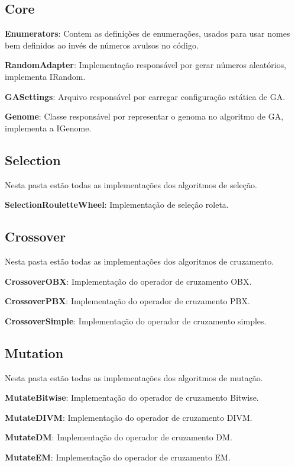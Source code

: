 \subsection{Core}

\textbf{Enumerators}: Contem as definições de enumerações, usados para usar nomes bem definidos ao invés de números avulsos no código.

\textbf{RandomAdapter}: Implementação responsável por gerar números aleatórios, implementa IRandom.

\textbf{GASettings}: Arquivo responsável por carregar configuração estática de GA.

\textbf{Genome}: Classe responsável por representar o genoma no algoritmo de GA, implementa a IGenome.

\subsection{Selection}

Nesta pasta estão todas as implementações dos algoritmos de seleção.

\textbf{SelectionRouletteWheel}: Implementação de seleção roleta.

\subsection{Crossover}

Nesta pasta estão todas as implementações dos algoritmos de cruzamento.

\textbf{CrossoverOBX}: Implementação do operador de cruzamento OBX.

\textbf{CrossoverPBX}: Implementação do operador de cruzamento PBX.

\textbf{CrossoverSimple}:  Implementação do operador de cruzamento simples.

\subsection{Mutation}

Nesta pasta estão todas as implementações dos algoritmos de mutação.

\textbf{MutateBitwise}: Implementação do operador de cruzamento Bitwise.

\textbf{MutateDIVM}: Implementação do operador de cruzamento DIVM.

\textbf{MutateDM}: Implementação do operador de cruzamento DM.

\textbf{MutateEM}: Implementação do operador de cruzamento EM.


